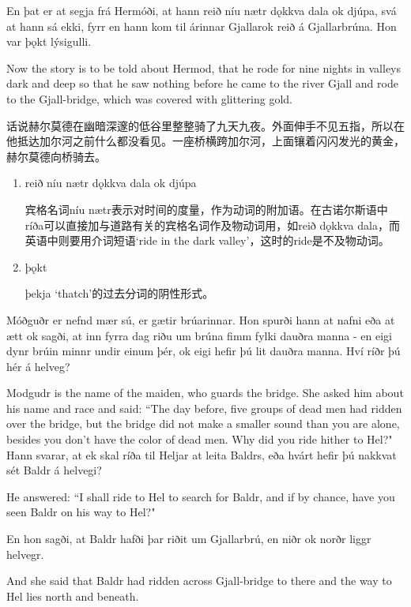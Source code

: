 \medskip
\begin{paracol}{2}
  En þat er at segja frá Hermóði, at hann reið níu nætr dǫkkva dala ok djúpa, svá at hann sá ekki, fyrr en hann kom til árinnar Gjallar\footnotemark ok reið á Gjallarbrúna. Hon var þǫkt lýsigulli.

  \switchcolumn

  Now the story is to be told about Hermod, that he rode for nine nights in valleys dark and deep so that he saw nothing before he came to the river Gjall and rode to the Gjall-bridge, which was covered with glittering gold.
\end{paracol}
\begin{translation*}{}
  话说赫尔莫德在幽暗深邃的低谷里整整骑了九天九夜。外面伸手不见五指，所以在他抵达加尔河之前什么都没看见。一座桥横跨加尔河，上面镶着闪闪发光的黄金，赫尔莫德向桥骑去。
\end{translation*}
\begin{grammar*}{}
  \begin{enumerate}[leftmargin=*]
    \item reið níu nætr dǫkkva dala ok djúpa

          宾格名词níu nætr表示对时间的度量，作为动词的附加语。在古诺尔斯语中ríða可以直接加与道路有关的宾格名词作及物动词用，如reið dǫkkva dala，而英语中则要用介词短语`ride in the dark valley'，这时的ride是不及物动词。

    \item þǫkt

          þekja `thatch'的过去分词的阴性形式。
  \end{enumerate}
\end{grammar*}
\begin{paracol}{2}
  Móðguðr er nefnd mær sú, er gætir brúarinnar. Hon spurði hann at nafni eða at ætt ok sagði, at inn fyrra dag riðu um brúna fimm fylki dauðra manna - en eigi dynr brúin minnr undir einum þér, ok eigi hefir þú lit dauðra manna. Hví ríðr þú hér á helveg?
  \switchcolumn

  Modgudr is the name of the maiden, who guards the bridge. She asked him about his name and race and said: ``The day before, five groups of dead men had ridden over the bridge, but the bridge did not make a smaller sound than you are alone, besides you don't have the color of dead men. Why did you ride hither to Hel?"
  \switchcolumn*
  Hann svarar, at ek skal ríða til Heljar at leita Baldrs, eða hvárt hefir þú nakkvat sét Baldr á helvegi?

  \switchcolumn

  He answered: ``I shall ride to Hel to search for Baldr, and if by chance, have you seen Baldr on his way to Hel?"

  \switchcolumn*
  En hon sagði, at Baldr hafði þar riðit um Gjallarbrú, en niðr ok norðr liggr helvegr.

  \switchcolumn
  And she said that Baldr had ridden across Gjall-bridge to there and the way to Hel lies north and beneath.
\end{paracol}
